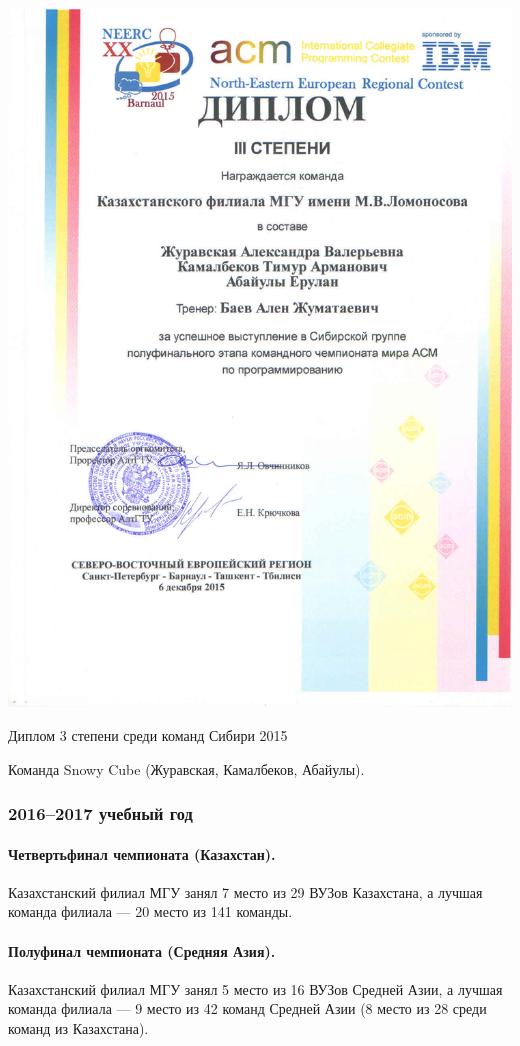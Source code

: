 \newpage
\mbox{}
\vfill
\begin{center}
\includegraphics[width=0.8\linewidth]{diploma/2015-barnaul}

Диплом 3 степени среди команд Сибири 2015

Команда Snowy Cube (Журавская, Камалбеков, Абайулы).
\end{center}
\vfill
\mbox{}
\newpage



\subsubsection*{2016--2017 учебный год}

\paragraph{Четвертьфинал чемпионата (Казахстан).} Казахстанский филиал МГУ занял 7 место из 29 ВУЗов Казахстана, а лучшая команда филиала --- 20 место из 141 команды.

\paragraph{Полуфинал чемпионата (Средняя Азия).} Казахстанский филиал МГУ занял 5 место из 16 ВУЗов Средней Азии, а лучшая команда филиала --- 9 место из 42 команд Средней Азии (8 место из 28 среди команд из Казахстана). 

